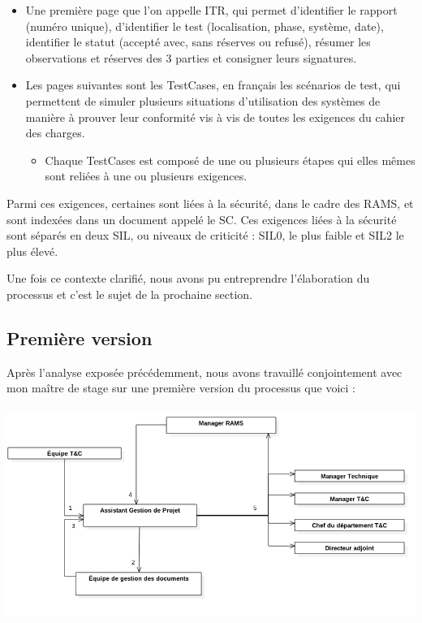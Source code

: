 \begin{itemize}
\item Une première page que l'on appelle ITR, qui permet d'identifier le rapport (numéro unique), d'identifier le test (localisation, phase, système, date), identifier le statut (accepté avec, sans réserves ou refusé), résumer les observations et réserves des 3 parties et consigner leurs signatures.
\item Les pages suivantes sont les \gls{TestCases}, en français les scénarios de test, qui permettent de simuler plusieurs situations d'utilisation des systèmes de manière à prouver leur conformité vis à vis de toutes les exigences du cahier des charges.
\begin{itemize}
\item Chaque \gls{TestCases} est composé de une ou plusieurs étapes qui elles mêmes sont reliées à une ou plusieurs exigences.
\end{itemize}
\end{itemize}

Parmi ces exigences, certaines sont liées à la sécurité, dans le cadre des \gls{RAMS}, et sont indexées dans un document appelé le \gls{SC}. Ces exigences liées à la sécurité sont séparés en deux \gls{SIL}, ou niveaux de criticité : SIL0, le plus faible et SIL2 le plus élevé.

Une fois ce contexte clarifié, nous avons pu entreprendre l'élaboration du processus et c'est le sujet de la prochaine section.

\subsection{Première version}

Après l'analyse exposée précédemment, nous avons travaillé conjointement avec mon maître de stage sur une première version du processus que voici :

\begin{center}
\includegraphics[height=7cm]{ressources/images/figures/Workflow1.png}
\end{center}


